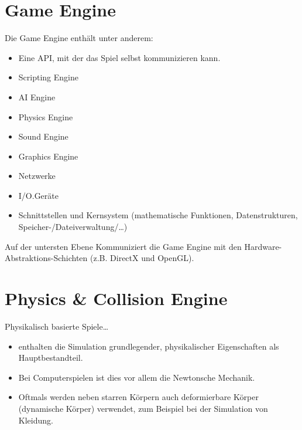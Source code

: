 	\section{Game Engine} %
		Die Game Engine enthält unter anderem:
		\begin{itemize}
			\item Eine API, mit der das Spiel selbst kommunizieren kann.
			\item Scripting Engine
			\item AI Engine
			\item Physics Engine
			\item Sound Engine
			\item Graphics Engine
			\item Netzwerke
			\item I/O.Geräte
			\item Schnittstellen und Kernsystem (mathematische Funktionen, Datenstrukturen, Speicher-/Dateiverwaltung/\dots)
		\end{itemize}
		Auf der untersten Ebene Kommuniziert die Game Engine mit den Hardware-Abstraktions-Schichten (z.B. DirectX und OpenGL).

	\section{Physics \& Collision Engine} %
		Physikalisch basierte Spiele\dots
		\begin{itemize}
			\item enthalten die Simulation grundlegender, physikalischer Eigenschaften als Hauptbestandteil.
			\item Bei Computerspielen ist dies vor allem die Newtonsche Mechanik.
			\item Oftmals werden neben starren Körpern auch deformierbare Körper (dynamische Körper) verwendet, zum Beispiel bei der Simulation von Kleidung.
		\end{itemize}

